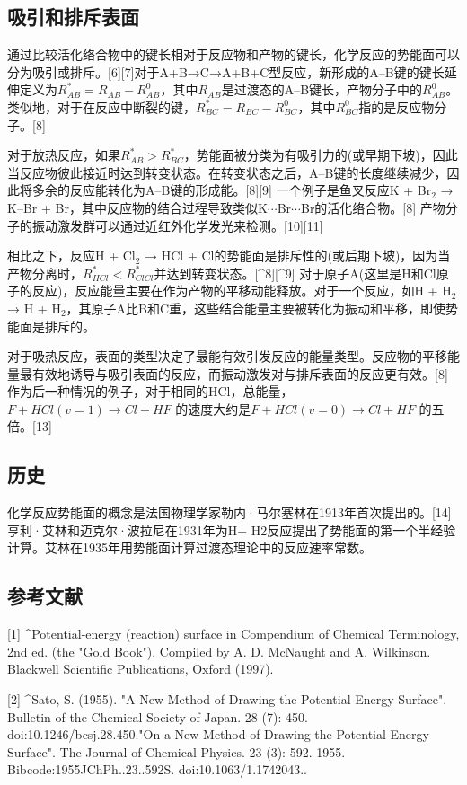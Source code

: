 \subsection{吸引和排斥表面}
通过比较活化络合物中的键长相对于反应物和产物的键长，化学反应的势能面可以分为吸引或排斥。[6][7]对于A+B→C→A+B+C型反应，新形成的A–B键的键长延伸定义为$R^*_{AB} = R_{AB} - R^0_{AB}$，其中$R_{AB}$是过渡态的A–B键长，产物分子中的$R^0_{AB}$。类似地，对于在反应中断裂的键，$R^*_{BC} = R_{BC} - R^0_{BC}$，其中$R^0_{BC}$指的是反应物分子。[8]

对于放热反应，如果$R^*_{AB} > R^*_{BC}$，势能面被分类为有吸引力的(或早期下坡)，因此当反应物彼此接近时达到转变状态。在转变状态之后，A–B键的长度继续减少，因此将多余的反应能转化为A–B键的形成能。[8][9] 一个例子是鱼叉反应K + Br$_2$ → K–Br + Br，其中反应物的结合过程导致类似K$\cdots$Br$\cdots$Br的活化络合物。[8] 产物分子的振动激发群可以通过近红外化学发光来检测。[10][11]

相比之下，反应H + Cl$_2$ → HCl + Cl的势能面是排斥性的(或后期下坡)，因为当产物分离时，$R^*_{HCl} < R^*_{ClCl}$并达到转变状态。[^8][^9] 对于原子A(这里是H和Cl原子的反应)，反应能量主要在作为产物的平移动能释放。对于一个反应，如H + H$_2$ → H + H$_2$，其原子A比B和C重，这些结合能量主要被转化为振动和平移，即使势能面是排斥的。

对于吸热反应，表面的类型决定了最能有效引发反应的能量类型。反应物的平移能量最有效地诱导与吸引表面的反应，而振动激发对与排斥表面的反应更有效。[8] 作为后一种情况的例子，对于相同的HCl，总能量， $F + HCl(v=1) \rightarrow Cl + HF$ 的速度大约是$F + HCl(v=0) \rightarrow Cl + HF$ 的五倍。[13]

\subsection{历史}
化学反应势能面的概念是法国物理学家勒内·马尔塞林在1913年首次提出的。[14] 亨利·艾林和迈克尔·波拉尼在1931年为H+ H2反应提出了势能面的第一个半经验计算。艾林在1935年用势能面计算过渡态理论中的反应速率常数。

\subsection{参考文献}
[1]
^Potential-energy (reaction) surface in Compendium of Chemical Terminology, 2nd ed. (the "Gold Book"). Compiled by A. D. McNaught and A. Wilkinson. Blackwell Scientific Publications, Oxford (1997).

[2]
^Sato, S. (1955). "A New Method of Drawing the Potential Energy Surface". Bulletin of the Chemical Society of Japan. 28 (7): 450. doi:10.1246/bcsj.28.450."On a New Method of Drawing the Potential Energy Surface". The Journal of Chemical Physics. 23 (3): 592. 1955. Bibcode:1955JChPh..23..592S. doi:10.1063/1.1742043..

